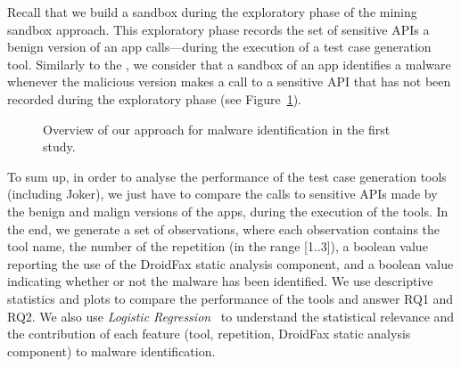Recall that we build a sandbox 
during the exploratory phase of the mining
sandbox approach. This exploratory
phase records the set of 
sensitive APIs a benign version of an
app calls---during the execution of a test
case generation tool. Similarly to the \blls,
we consider that a sandbox of an
app identifies a malware whenever the
malicious version makes a call to a sensitive API  
that has not been recorded during the exploratory
phase (see Figure~\ref{fig:settings1}).

\begin{figure}
  \caption{Overview of our approach for malware identification in the first study.}
  \label{fig:settings1}
\end{figure}

To sum up, in order to analyse the
performance of the test case generation tools (including Joker),
we just have to compare the calls to sensitive APIs made by
the benign and malign versions of the apps, during
the execution of the tools. In the end, we generate
a set of observations, where each observation
contains the tool name, the number of the repetition (in the
range [1..3]), a boolean value reporting the use of the
DroidFax static analysis component, and a boolean value indicating
whether or not the malware has been identified. We use descriptive statistics
and plots to compare the performance of the tools and
answer RQ1 and RQ2. We also use \emph{Logistic Regression}~\cite[Chapter~4]{statistical-learning}
to understand the statistical relevance and
the contribution of each feature (tool, repetition, DroidFax static analysis
component) to malware identification. 

